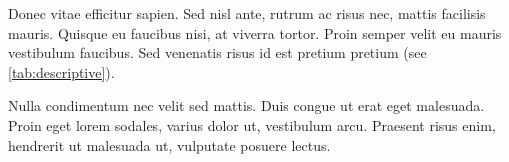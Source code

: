 \documentclass[a4paper,12pt,stu,donotrepeattitle,floatsintext,twoside]{apa7}
\begin{document}
Donec vitae efficitur sapien. Sed nisl ante, rutrum ac risus nec, mattis facilisis mauris. Quisque eu faucibus nisi, at viverra tortor. Proin semper velit eu mauris vestibulum faucibus. Sed venenatis risus id est pretium pretium (see \cref{tab:descriptive}).

Nulla condimentum nec velit sed mattis. Duis congue ut erat eget malesuada. Proin eget lorem sodales, varius dolor ut, vestibulum arcu. Praesent risus enim, hendrerit ut malesuada ut, vulputate posuere lectus.


\end{document}
